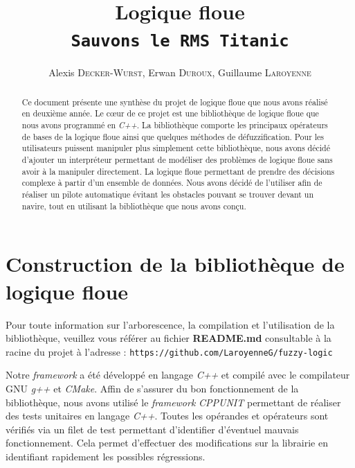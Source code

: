 \documentclass[a4paper,11pt]{article}
\title{Logique floue\\\texttt{Sauvons le RMS Titanic}}
\author{Alexis \textsc{Decker-Wurst}, Erwan  \textsc{Duroux}, Guillaume  \textsc{Laroyenne}}
\begin{document}
    \maketitle

    \begin{abstract}
        Ce document présente une synthèse du projet de logique floue que nous avons réalisé en deuxième année.
        Le cœur de ce projet est une bibliothèque de logique floue que nous avons programmé en \textit{C++}. La bibliothèque comporte les principaux opérateurs de bases de la logique floue ainsi que quelques méthodes de défuzzification.
        Pour les utilisateurs puissent manipuler plus simplement cette bibliothèque, nous avons décidé d'ajouter un interpréteur permettant de modéliser des problèmes de logique floue sans avoir à la manipuler directement.
        La logique floue permettant de prendre des décisions complexe à partir d'un ensemble de données. Nous avons décidé de l'utiliser afin de réaliser un pilote automatique évitant les obstacles pouvant se trouver devant un navire, tout en utilisant la bibliothèque que nous avons conçu.
    \end{abstract}

    \section{Construction de la bibliothèque de logique floue}

    \begin{center}
        Pour toute information sur l'arborescence, la compilation et l'utilisation de la bibliothèque, veuillez vous référer au fichier \textbf{README.md} consultable à la racine du projet à l’adresse : \texttt{https://github.com/LaroyenneG/fuzzy-logic}
    \end{center}

    Notre \textit{framework} a été développé en langage \textit{C++} et compilé avec le compilateur GNU \textit{g++} et \textit{CMake}.
    Affin de s’assurer du bon fonctionnement de la bibliothèque, nous avons utilisé le \textit{framework} \textit{CPPUNIT} permettant de réaliser des tests unitaires en langage \textit{C++}.
    Toutes les opérandes et opérateurs sont vérifiés via un filet de test permettant d’identifier d’éventuel mauvais fonctionnement.
    Cela permet d'effectuer des modifications sur la librairie en identifiant rapidement les possibles régressions.
\end{document}
